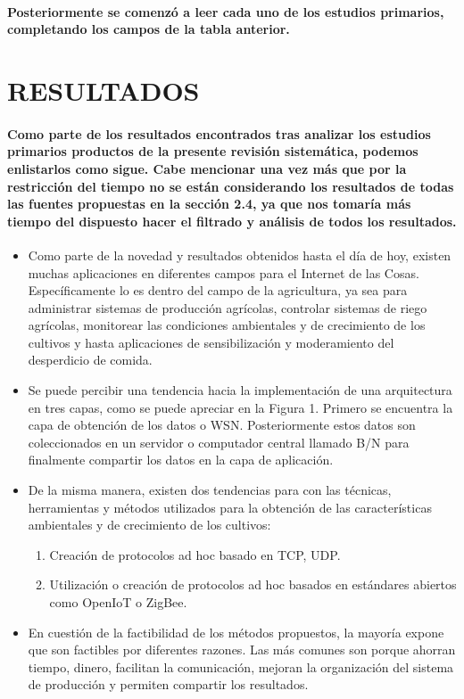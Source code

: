 \documentclass[10pt, twocolumn]{article}
\begin{document}
\paragraph{Posteriormente se comenzó a leer cada uno de los estudios primarios, completando los campos de la tabla anterior.}

\section{RESULTADOS}
\paragraph{Como parte de los resultados encontrados tras analizar los estudios primarios productos de la presente revisión sistemática, podemos enlistarlos como sigue. Cabe mencionar una vez más que por la restricción del tiempo no se están considerando los resultados de todas las fuentes propuestas en la sección 2.4, ya que nos tomaría más tiempo del dispuesto hacer el filtrado y análisis de todos los resultados.}
\begin{itemize}
	\item{Como parte de la novedad y resultados obtenidos hasta el día de hoy, existen muchas aplicaciones en diferentes campos para el Internet de las Cosas. Específicamente lo es dentro del campo de la agricultura, ya sea para administrar sistemas de producción agrícolas, controlar sistemas de riego agrícolas, monitorear las condiciones ambientales y de crecimiento de los cultivos y hasta aplicaciones de sensibilización y moderamiento del desperdicio de comida.}
	\item{Se puede percibir una tendencia hacia la implementación de una arquitectura en tres capas, como se puede apreciar en la Figura 1. Primero se encuentra la capa de obtención de los datos o WSN. Posteriormente estos datos son coleccionados en un servidor o computador central llamado B/N para finalmente compartir los datos en la capa de aplicación.}
	\item{De la misma manera, existen dos tendencias para con las técnicas, herramientas y métodos utilizados para la obtención de las características ambientales y de crecimiento de los cultivos:}
	\begin{enumerate}
		\item{Creación de protocolos ad hoc basado en TCP, UDP.}
		\item{Utilización o creación de protocolos ad hoc basados en estándares abiertos como OpenIoT o ZigBee.}
	\end{enumerate}
	\item{En cuestión de la factibilidad de los métodos propuestos, la mayoría expone que son factibles por diferentes razones. Las más comunes son porque ahorran tiempo, dinero, facilitan la comunicación, mejoran la organización del sistema de producción y permiten compartir los resultados.}
\end{itemize}
\end{document}
